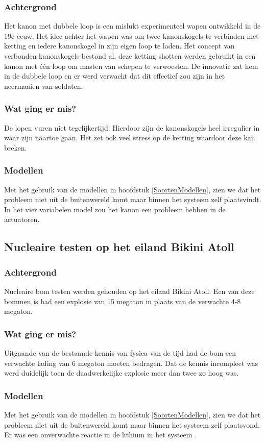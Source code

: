 \documentclass{article}
\begin{document}
\subsubsection{Achtergrond}
Het kanon met dubbele loop is een mislukt experimenteel wapen ontwikkeld in de 19e eeuw. Het idee achter het wapen was om twee kanonskogels te verbinden met ketting en iedere kanonskogel in zijn eigen loop te laden. Het concept van verbonden kanonskogels bestond al, deze ketting shotten werden gebruikt in een kanon met één loop om masten van schepen te verwoesten. De innovatie zat hem in de dubbele loop en er werd verwacht dat dit effectief zou zijn in het neermaaien van soldaten.
\subsubsection{Wat ging er mis?}
De lopen vuren niet tegelijkertijd. Hierdoor zijn de kanonskogels heel irregulier in waar zijn naartoe gaan. Het zet ook veel stress op de ketting waardoor deze kan breken.
\subsubsection{Modellen}
Met het gebruik van de modellen in hoofdstuk \ref{SoortenModellen}, zien we dat het probleem niet uit de buitenwereld komt maar binnen het systeem zelf plaatsvindt. In het vier variabelen model zou het kanon een probleem hebben in de actuatoren.

\subsection{Nucleaire testen op het eiland Bikini Atoll}
\subsubsection{Achtergrond}
Nucleaire bom testen werden gehouden op het eiland Bikini Atoll. Een van deze bommen is had een explosie van 15 megaton in plaats van de verwachte 4-8 megaton.
\subsubsection{Wat ging er mis?}
Uitgaande van de bestaande kennis van fysica van de tijd had de bom een verwachte lading van 6 megaton moeten bedragen. Dat de kennis incompleet was werd duidelijk toen de daadwerkelijke explosie meer dan twee zo hoog was.
\subsubsection{Modellen}
Met het gebruik van de modellen in hoofdstuk \ref{SoortenModellen}, zien we dat het probleem niet uit de buitenwereld komt maar binnen het systeem zelf plaatsvond. Er was een onverwachte reactie in de lithium in het systeem \cite{castlebravonuke}.
\end{document}
